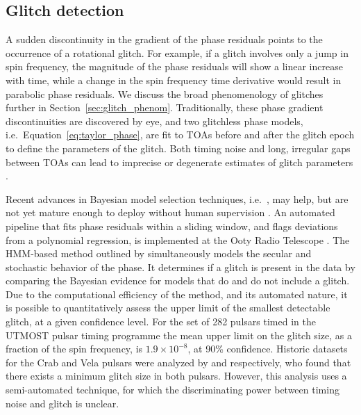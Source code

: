\subsection{Glitch detection} \label{sec:intro_gd}
A sudden discontinuity in the gradient of the phase residuals points to the occurrence of a rotational glitch. For example, if a glitch involves only a jump in spin frequency, the magnitude of the phase residuals will show a linear increase with time, while a change in the spin frequency time derivative would result in parabolic phase residuals. We discuss the broad phenomenology of glitches further in Section~\ref{sec:glitch_phenom}. Traditionally, these phase gradient discontinuities are discovered by eye, and two glitchless phase models, i.e.~Equation~\eqref{eq:taylor_phase}, are fit to TOAs before and after the glitch epoch to define the parameters of the glitch. Both timing noise and long, irregular gaps between TOAs can lead to imprecise or degenerate estimates of glitch parameters \citep{Lyne1996, Dunn2021}. 

Recent advances in Bayesian model selection techniques, i.e.~{}, may help, but are not yet mature enough to deploy without human supervision \citep{Lower2020}. An automated pipeline that fits phase residuals within a sliding window, and flags deviations from a polynomial regression, is implemented at the Ooty Radio Telescope \citep{Singha2021a}. The HMM-based method outlined by \citet{Melatos2020hmm} simultaneously models the secular and stochastic behavior of the phase. It determines if a glitch is present in the data by comparing the Bayesian evidence for models that do and do not include a glitch. Due to the computational efficiency of the method, and its automated nature, it is possible to quantitatively assess the upper limit of the smallest detectable glitch, at a given confidence level. For the set of 282 pulsars timed in the UTMOST \citep{Jankowski2019} pulsar timing programme the mean upper limit on the glitch size, as a fraction of the spin frequency, is $1.9\times 10^{-8}$, at 90\% confidence. Historic datasets for the Crab and Vela pulsars were analyzed by \citet{Espinoza2014} and \citet{Espinoza2021} respectively, who found that there exists a minimum glitch size in both pulsars. However, this analysis uses a semi-automated technique, for which the discriminating power between timing noise and glitch is unclear.


